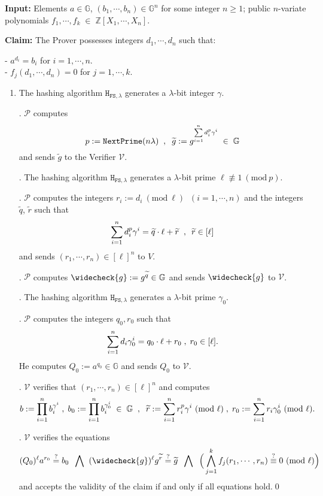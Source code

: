\documentclass[11pt, lettersize, notitlepage, leqno, footskip=0.6cm]{article}
\newcommand{\bz}{\mathbb Z}
\newcommand{\pl}{\prod\limits}
\newcommand{\slim}{\sum\limits}
\newcommand{\ttt}{\texttt}
\newcommand{\bG}{\mathbb{G}}
\newcommand{\wti}{\widetilde}
\newcommand{\mc}{\mathcal}
\newcommand{\mb}{\mathbb}
\newcommand{\lam}{\lambda}
\newcommand{\weck}{\widecheck}
\newcommand{\mP}{\mc{P}}
\newcommand{\V}{\mc{V}}
\newcommand{\vs}{\vspace{-0.15cm}}
\newcommand{\noin}{\noindent}
\newcommand{\sta}{\stackrel{?}{=}}
\newcommand{\Mod}[1]{\ (\mathrm{mod}\ #1)}
\numberwithin{equation}{section}
\begin{document}
\noin \textbf{Input:} Elements $a\in\mb{G} $, $(b_1,\cdots,b_n)\in \mb{G}^n$ for some integer $n\geq 1$; public $n$-variate polynomials $f_1,\cdots,f_k\;\in\; \bz[X_1,\cdots,X_n]$.

\noin \textbf{Claim:} The Prover possesses integers $d_1,\cdots, d_n$ such that:

\noindent- $a^{d_i} = b_i$ for $i = 1,\cdots, n$.\\
- $f_j(d_1,\cdots,d_n) = 0$ for $j = 1,\cdots, k$.

\begin{enumerate}[wide, labelwidth=!, labelindent=0pt] \item The hashing algorithm $\ttt{H}_{\ttt{FS},\lam}$ generates a $\lam$-bit integer $\gamma$.

\noin 2. $\mc{P}$ computes \vs $$p:= \ttt{NextPrime}(n\lam)\;\;,\;\;\wti{g} :=g^{\sum\limits_{i=1}^n d_i^{p}\gamma^i}\;\in\;\bG\vs $$ and sends $\wti{g}$ to the Verifier $\mc{V}$.

\noin 3. The hashing algorithm $\ttt{H}_{\ttt{FS},\lam}$ generates a $\lam$-bit prime $\ell\not\equiv 1\Mod{p}$.
 
\noin 4. $\mc{P}$ computes the integers $r_i:=d_i\Mod{\ell}\;\; (i=1,\cdots, n)$ and the integers $\wti{q}$, $\wti{r}$ such that \vs $$\slim_{i=1}^n d_i^{p}\gamma^i = \wti{q} \cdot \ell+\wti{r}\;\;,\:\;\wti{r}\in [\ell] \vs $$ and sends $(r_1,\cdots,r_n)\in [\ell]^n$ to $V$.

\noin 5. $\mP$ computes $\weck{g}:= g^{\wti{q}}\in \bG$ and sends $\weck{g}$ to  $\V$. 

\noin 6. The hashing algorithm $\ttt{H}_{\ttt{FS},\lam}$ generates a $\lam$-bit prime $\gamma_{0}$.

\noin 7. $\mP$ computes the integers $q_0, r_0$ such that \vs $$\slim_{i=1}^n d_i\gamma_{0}^i = q_0 \cdot \ell+r_0\;,\;r_0\in[\ell] . \vs$$ He computes $Q_0:= a^{q_{0}}\in \bG$ and sends $Q_0$ to $\V$.

\noin 8. $\mc{V}$ verifies that $(r_1,\cdots,r_n)\in [\ell]^n$ and computes \vs $$b := \pl_{i=1}^n b_i^{\gamma^i}\;,\;b_0 := \pl_{i=1}^n b_i^{\gamma_{0}^i}\;\in \;\bG\;\;,\;\;\wti{r}:= \slim_{i=1}^n r_i^{p}\gamma^i\Mod{\ell}\;,\;r_0:=\slim_{i=1}^n r_i\gamma_{0}^i\Mod{\ell}. \vs $$ 

\noin 9. $\mc{V}$ verifies the equations \vs $$ (Q_0)^{\ell} a^{r_{0}} \sta b_0 \;\;\bigwedge\;\; (\weck{g})^{\ell}g^{\wti{r}} \stackrel{?}{=}\wti{g} \;\;\bigwedge\;\;\Big( \bigwedge\limits_{j=1}^k  f_j(r_1,\cdots,r_n) \stackrel{?}{\equiv} 0\Mod{\ell} \Big) \vs $$ and accepts the validity of the claim if and only if all equations hold.\qed \end{enumerate}
\end{document}

